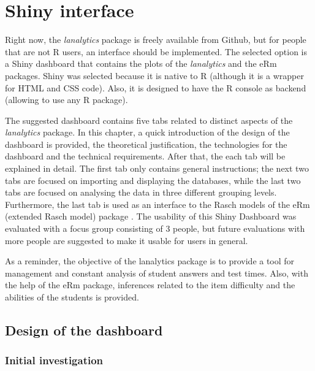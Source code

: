 \chapter{Shiny interface}

Right now, the \textit{lanalytics} package is freely available from Github, but for people that are not R users, an interface should be implemented. The selected option is a Shiny dashboard \cite{shiny} \cite{chang2015shinydashboard} that contains the plots of the \textit{lanalytics} and the eRm packages. Shiny was selected because it is native to R (although it is a wrapper for HTML and CSS code). Also, it is designed to have the R console as backend (allowing to use any R package). 

The suggested dashboard contains five tabs related to distinct aspects of the \textit{lanalytics} package. In this chapter, a quick introduction of the design of the dashboard is provided, the theoretical justification, the technologies for the dashboard and the technical requirements. After that, the each tab will be explained in detail. The first tab only contains general instructions; the next two tabs are focused on importing and displaying the databases, while the last two tabs are focused on analysing the data in three different grouping levels. Furthermore, the last tab is used as an interface to the Rasch models of the eRm (extended Rasch model) package \cite{mair2009extended}. The usability of this Shiny Dashboard was evaluated with a focus group consisting of 3 people, but future evaluations with more people are suggested to make it usable for users in general.

As a reminder, the objective of the lanalytics package is to provide a tool for management and constant analysis of student answers and test times. Also, with the help of the eRm package, inferences related to the item difficulty and the abilities of the students is provided.

\section{Design of the dashboard}

\subsection{Initial investigation}


